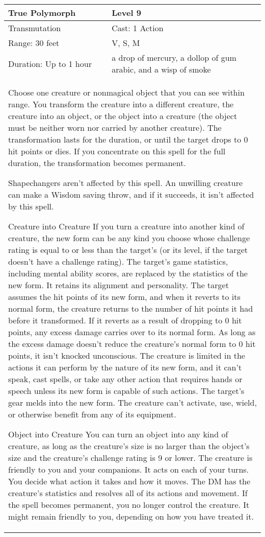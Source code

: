 \documentclass[11pt]{report}
\begin{document}
\begin{table}[H]
	\begin{tabular}{||p{6cm}|p{6cm}||}
		\hline\hline
		\bf{True Polymorph} & Level 9\\ \hline
		Transmutation & Cast: 1 Action\\ \hline
		Range: 30 feet & V, S, M\\ \hline
		Duration: Up to 1 hour & a drop of mercury, a dollop of gum arabic, and a wisp of smoke\\ \hline
		\multicolumn{2}{||p{12cm}||}{Choose one creature or nonmagical object that you can see within range. You transform the creature into a different creature, the creature into an object, or the object into a creature (the object must be neither worn nor carried by another creature). The transformation lasts for the duration, or until the target drops to 0 hit points or dies. If you concentrate on this spell for the full duration, the transformation becomes permanent.

Shapechangers aren’t affected by this spell. An unwilling creature can make a Wisdom saving throw, and if it succeeds, it isn’t affected by this spell.

Creature into Creature
If you turn a creature into another kind of creature, the new form can be any kind you choose whose challenge rating is equal to or less than the target’s (or its level, if the target doesn’t have a challenge rating). The target’s game statistics, including mental ability scores, are replaced by the statistics of the new form. It retains its alignment and personality.
The target assumes the hit points of its new form, and when it reverts to its normal form, the creature returns to the number of hit points it had before it transformed. If it reverts as a result of dropping to 0 hit points, any excess damage carries over to its normal form. As long as the excess damage doesn’t reduce the creature’s normal form to 0 hit points, it isn’t knocked unconscious.
The creature is limited in the actions it can perform by the nature of its new form, and it can’t speak, cast spells, or take any other action that requires hands or speech unless its new form is capable of such actions.
The target’s gear melds into the new form. The creature can’t activate, use, wield, or otherwise benefit from any of its equipment.

Object into Creature
You can turn an object into any kind of creature, as long as the creature’s size is no larger than the object’s size and the creature’s challenge rating is 9 or lower. The creature is friendly to you and your companions. It acts on each of your turns. You decide what action it takes and how it moves. The DM has the creature’s statistics and resolves all of its actions and movement.
If the spell becomes permanent, you no longer control the creature. It might remain friendly to you, depending on how you have treated it.

}
\end{tabular}
\end{table}
\end{document}
